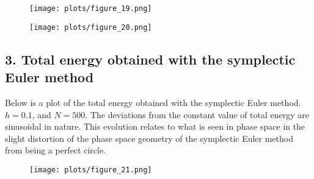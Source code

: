 \documentclass{article}
\begin{document}
\begin{figure}[H]
\centering
\texttt{[image: plots/figure\_19.png]}
\end{figure}

\begin{figure}[H]
\centering
\texttt{[image: plots/figure\_20.png]}
\end{figure}

\subsection*{3. Total energy obtained with the symplectic Euler method}
Below is a plot of the total energy obtained with the symplectic Euler method. $h = 0.1$, and $N = 500$. The deviations from the constant value of total energy are sinusoidal in nature. This evolution relates to what is seen in phase space in the slight distortion of the phase space geometry of the symplectic Euler method from being a perfect circle.

\begin{figure}[H]
\centering
\texttt{[image: plots/figure\_21.png]}
\end{figure}
\end{document}
